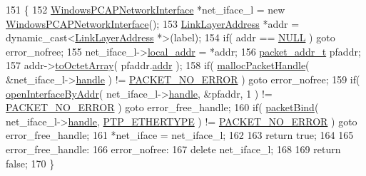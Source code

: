 \begin{DoxyCode}
151                                                                                                            
                     \{
152         \hyperlink{class_windows_p_c_a_p_network_interface}{WindowsPCAPNetworkInterface} *net\_iface\_l = \textcolor{keyword}{new} 
      \hyperlink{class_windows_p_c_a_p_network_interface}{WindowsPCAPNetworkInterface}();
153         \hyperlink{class_link_layer_address}{LinkLayerAddress} *addr = \textcolor{keyword}{dynamic\_cast<}\hyperlink{class_link_layer_address}{LinkLayerAddress} *\textcolor{keyword}{>}(label);
154         \textcolor{keywordflow}{if}( addr == \hyperlink{openavb__types__base__pub_8h_a070d2ce7b6bb7e5c05602aa8c308d0c4}{NULL} ) \textcolor{keywordflow}{goto} error\_nofree;
155         net\_iface\_l->\hyperlink{class_windows_p_c_a_p_network_interface_af3d1546f688fbb9cec0317d152cab1da}{local\_addr} = *addr;
156         \hyperlink{structpacket__addr__t}{packet\_addr\_t} pfaddr;
157         addr->\hyperlink{class_link_layer_address_a1e2896b540d2ea6182d351332737db91}{toOctetArray}( pfaddr.\hyperlink{structpacket__addr__t_ab8af51bba340e97aebc45b9c943fb17c}{addr} );
158         \textcolor{keywordflow}{if}( \hyperlink{packet_8cpp_a690d2b722b8729de51e1b9a47b0611cc}{mallocPacketHandle}( &net\_iface\_l->\hyperlink{class_windows_p_c_a_p_network_interface_af365a053e5f8823efe7e4ed6a209cd8e}{handle} ) != 
      \hyperlink{packet_8hpp_ab3fbaeb946a71bfe3ce597df43a5dc27a1d7065f5b2e237a9ae36fafa1557ef31}{PACKET\_NO\_ERROR} ) \textcolor{keywordflow}{goto} error\_nofree;
159         \textcolor{keywordflow}{if}( \hyperlink{packet_8cpp_a31fcce4e604707ab63353ca20a923768}{openInterfaceByAddr}( net\_iface\_l->\hyperlink{class_windows_p_c_a_p_network_interface_af365a053e5f8823efe7e4ed6a209cd8e}{handle}, &pfaddr, 1 ) != 
      \hyperlink{packet_8hpp_ab3fbaeb946a71bfe3ce597df43a5dc27a1d7065f5b2e237a9ae36fafa1557ef31}{PACKET\_NO\_ERROR} ) \textcolor{keywordflow}{goto} error\_free\_handle;
160         \textcolor{keywordflow}{if}( \hyperlink{packet_8cpp_a1b3c89cf335c66684896187ccbbec3fc}{packetBind}( net\_iface\_l->\hyperlink{class_windows_p_c_a_p_network_interface_af365a053e5f8823efe7e4ed6a209cd8e}{handle}, \hyperlink{ptptypes_8hpp_a66b4264d8a3f30b62462917df20c3593}{PTP\_ETHERTYPE} ) != 
      \hyperlink{packet_8hpp_ab3fbaeb946a71bfe3ce597df43a5dc27a1d7065f5b2e237a9ae36fafa1557ef31}{PACKET\_NO\_ERROR} ) \textcolor{keywordflow}{goto} error\_free\_handle;
161         *net\_iface = net\_iface\_l;
162 
163         \textcolor{keywordflow}{return} \textcolor{keyword}{true};
164 
165 error\_free\_handle:
166 error\_nofree:
167         \textcolor{keyword}{delete} net\_iface\_l;
168 
169         \textcolor{keywordflow}{return} \textcolor{keyword}{false};
170     \}
\end{DoxyCode}


